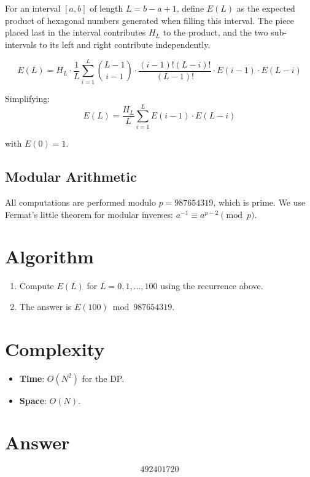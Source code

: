 \documentclass[12pt]{article}
\begin{document}
For an interval $[a, b]$ of length $L = b - a + 1$, define $E(L)$ as the expected product of hexagonal numbers generated when filling this interval. The piece placed last in the interval contributes $H_L$ to the product, and the two sub-intervals to its left and right contribute independently.

\[
E(L) = H_L \cdot \frac{1}{L} \sum_{i=1}^{L} \binom{L-1}{i-1} \cdot \frac{(i-1)!(L-i)!}{(L-1)!} \cdot E(i-1) \cdot E(L-i)
\]

Simplifying:
\[
E(L) = \frac{H_L}{L} \sum_{i=1}^{L} E(i-1) \cdot E(L-i)
\]

with $E(0) = 1$.

\subsection{Modular Arithmetic}
All computations are performed modulo $p = 987654319$, which is prime. We use Fermat's little theorem for modular inverses: $a^{-1} \equiv a^{p-2} \pmod{p}$.

\section{Algorithm}
\begin{enumerate}
    \item Compute $E(L)$ for $L = 0, 1, \ldots, 100$ using the recurrence above.
    \item The answer is $E(100) \bmod 987654319$.
\end{enumerate}

\section{Complexity}
\begin{itemize}
    \item \textbf{Time}: $O(N^2)$ for the DP.
    \item \textbf{Space}: $O(N)$.
\end{itemize}

\section{Answer}

\[
\boxed{492401720}
\]
\end{document}

